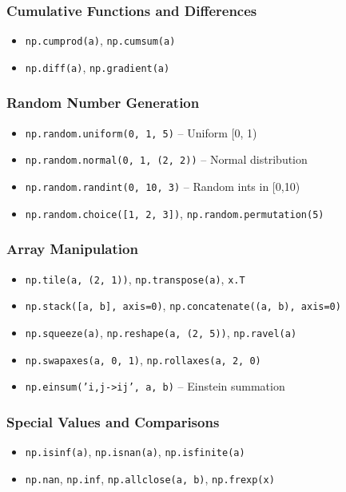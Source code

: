 \documentclass{article}
\begin{document}
\subsubsection*{Cumulative Functions and Differences}
\begin{itemize}
    \item \texttt{np.cumprod(a)}, \texttt{np.cumsum(a)}
    \item \texttt{np.diff(a)}, \texttt{np.gradient(a)}
\end{itemize}

\subsubsection*{Random Number Generation}
\begin{itemize}
    \item \texttt{np.random.uniform(0, 1, 5)} -- Uniform [0, 1)
    \item \texttt{np.random.normal(0, 1, (2, 2))} -- Normal distribution
    \item \texttt{np.random.randint(0, 10, 3)} -- Random ints in [0,10)
    \item \texttt{np.random.choice([1, 2, 3])}, \texttt{np.random.permutation(5)}
\end{itemize}

\subsubsection*{Array Manipulation}
\begin{itemize}
    \item \texttt{np.tile(a, (2, 1))}, \texttt{np.transpose(a)}, \texttt{x.T}
    \item \texttt{np.stack([a, b], axis=0)}, \texttt{np.concatenate((a, b), axis=0)}
    \item \texttt{np.squeeze(a)}, \texttt{np.reshape(a, (2, 5))}, \texttt{np.ravel(a)}
    \item \texttt{np.swapaxes(a, 0, 1)}, \texttt{np.rollaxes(a, 2, 0)}
    \item \texttt{np.einsum('i,j->ij', a, b)} -- Einstein summation
\end{itemize}

\subsubsection*{Special Values and Comparisons}
\begin{itemize}
    \item \texttt{np.isinf(a)}, \texttt{np.isnan(a)}, \texttt{np.isfinite(a)}
    \item \texttt{np.nan}, \texttt{np.inf}, \texttt{np.allclose(a, b)}, \texttt{np.frexp(x)}
\end{itemize}
\end{document}
